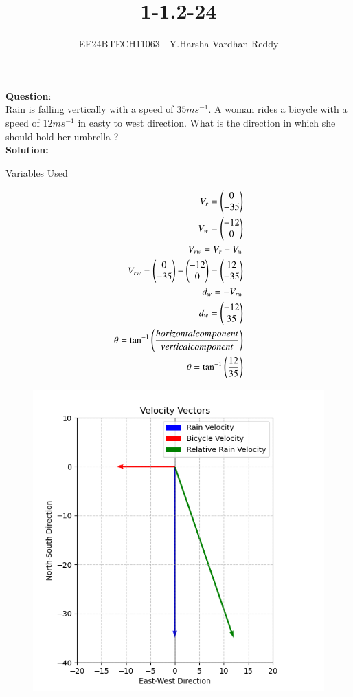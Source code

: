 \documentclass[journal]{IEEEtran}
\begin{document}

\vspace{3cm}

\title{1-1.2-24}
\author{EE24BTECH11063 - Y.Harsha Vardhan Reddy
}
{\let\newpage\relax\maketitle}

\renewcommand{\thefigure}{\theenumi}
\renewcommand{\thetable}{\theenumi}
\setlength{\intextsep}{10pt} %


\renewcommand{\thetable}{\theenumi}
\textbf{Question}:\\
Rain is falling vertically with a speed of $35ms^{-1}$. A woman rides a bicycle with a speed of $12ms^{-1}$ in easty to west direction. What is the direction in which she should hold her umbrella ?
\\
\textbf{Solution: }
\begin{table}[h!]    
  \centering
  
  \caption{Variables Used}
  \label{tab1-1.2-20}
\end{table}
\begin{align}
V_r=\begin{pmatrix}0\\-35\end{pmatrix} \\
V_w=\begin{pmatrix}-12\\0\end{pmatrix} \\
V_{rw}=V_r-V_w \\
V_{rw}=\begin{pmatrix}0\\-35\end{pmatrix}-\begin{pmatrix}-12\\0\end{pmatrix}=\begin{pmatrix}12\\-35\end{pmatrix}\\
    d_w=-V_{rw} \\
    d_w=\begin{pmatrix}-12\\35\end{pmatrix}\\
    \theta = \tan^{-1}\left(\frac{horizontal component}{vertical component}\right)\\
    \theta = \tan^{-1}\left(\frac{12}{35}\right)
\end{align}
\begin{figure}[h!]
   \centering
   \includegraphics[width=0.7\linewidth]{figure_1.png}
   \label{stemplot}
\end{figure}
\end{document}
